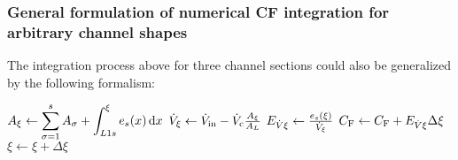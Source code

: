 \subsubsection*{General formulation of numerical CF integration for arbitrary channel shapes}
The integration process above for three channel sections could also be generalized by the following formalism:
\begin{algorithmic}
\State $A_\xi \leftarrow \displaystyle\sum_{\sigma=1}^{s}A_\sigma + \displaystyle\int_{L1s}^\xi e_s(x) \mathop{}\!\mathrm{d} x $
\State $ \dot{V}_\xi \leftarrow \dot{V}_\text{in} - \dot{V}_\text{c} \frac{A_\xi}{A_L} $ 
\State $E_{\dot{V}\xi} \leftarrow \frac{e_s(\xi)}{\dot{V}_\xi} $
\State $C_\text{F} \leftarrow C_\text{F} + E_{\dot{V}\xi} \Delta\xi $
\State $\xi \leftarrow \xi + \Delta\xi $
\EndWhile
\EndFor
\end{algorithmic}



